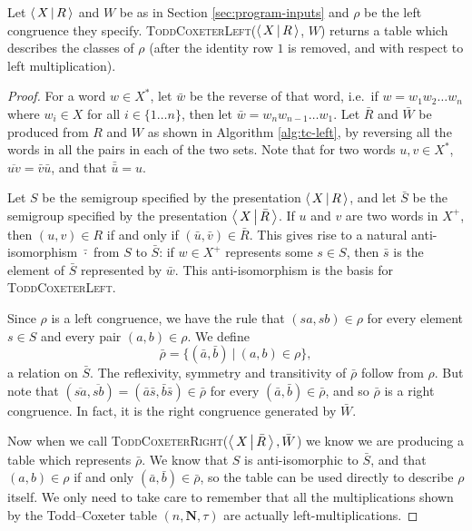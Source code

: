 \begin{theorem}
  Let $\left\langle \, X \, \middle| \, R \, \right\rangle$ and $W$ be as in Section \ref{sec:program-inputs} and $\rho$
  be the left congruence they specify.
  \textsc{ToddCoxeterLeft($\left\langle \, X \, \middle| \, R \, \right\rangle$, $W$)} returns a table which describes the
  classes of $\rho$ (after the identity row $1$ is removed, and with respect to
  left multiplication).
  \begin{proof}
    For a word $w \in X^*$, let $\bar w$ be the reverse of that word, i.e.~if
    $w = w_1 w_2 \ldots w_n$ where $w_i \in X$ for all $i \in \{1 \ldots n\}$,
    then let $\bar w = w_n w_{n-1} \ldots w_1$.  Let $\bar R$ and $\bar W$ be
    produced from $R$ and $W$ as shown in Algorithm \ref{alg:tc-left}, by
    reversing all the words in all the pairs in each of the two sets.
    Note that for two words $u, v \in X^*$, $\overline{uv} = \bar v \bar u$, and
    that $\bar{\bar u} = u$.

    Let $S$ be the semigroup specified by the presentation $\left\langle \, X \, \middle| \, R \, \right\rangle$, and let
    $\bar S$ be the semigroup specified by the presentation $\left\langle \, X \, \middle| \, \bar R \, \right\rangle$.
    If $u$ and $v$ are two words in $X^+$, then $(u, v) \in R$ if and only if
    $(\bar u, \bar v) \in \bar R$.  This gives rise to a natural anti-isomorphism
    $\bar \cdot$ from $S$ to $\bar S$: if $w \in X^+$ represents some $s \in S$,
    then $\bar s$ is the element of $\bar S$ represented by $\bar w$.  This
    anti-isomorphism is the basis for \textsc{ToddCoxeterLeft}.

    Since $\rho$ is a left congruence, we have the rule that $(sa, sb) \in \rho$
    for every element $s \in S$ and every pair $(a,b) \in \rho$.  We define
    $$\bar\rho = \{(\bar a, \bar b) ~|~ (a,b) \in \rho\},$$
    a relation on $\bar S$.  The reflexivity, symmetry and transitivity of
    $\bar\rho$ follow from $\rho$.  But note that
    $(\overline{sa}, \overline{sb}) = (\bar a \bar s, \bar b \bar s) \in
    \bar\rho$
    for every $(\bar a, \bar b) \in \bar\rho$, and so $\bar\rho$ is a right
    congruence.  In fact, it is the right congruence generated by $\bar W$.

    Now when we call \textsc{ToddCoxeterRight}($\left\langle \, X \, \middle| \, \bar R \, \right\rangle, \bar W$) we
    know we are producing a table which represents $\bar\rho$.  We know that $S$
    is anti-isomorphic to $\bar S$, and that $(a,b) \in \rho$ if and only
    $(\bar a, \bar b) \in \bar\rho$, so the table can be used directly to
    describe $\rho$ itself.  We only need to take care to remember that all the
    multiplications shown by the Todd--Coxeter table $(n, \mathbf{N}, \tau)$ are
    actually left-multiplications.
  \end{proof}
\end{theorem}

